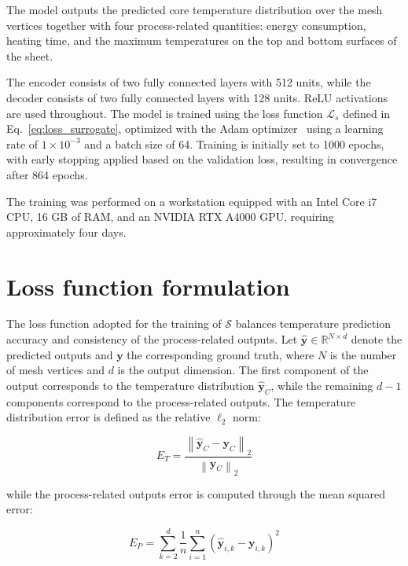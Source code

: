 The model outputs the predicted core temperature distribution over the mesh vertices together with four process-related quantities: energy consumption, heating time, and the maximum temperatures on the top and bottom surfaces of the sheet.

The encoder consists of two fully connected layers with 512 units, while the decoder consists of two fully connected layers with 128 units. ReLU activations are used throughout. The model is trained using the loss function $\mathcal{L}_s$ defined in Eq.~\ref{eq:loss_surrogate}, optimized with the Adam optimizer~\cite{kingma2014adam} using a learning rate of $1 \times 10^{-3}$ and a batch size of 64. Training is initially set to 1000 epochs, with early stopping applied based on the validation loss, resulting in convergence after 864 epochs.

The training was performed on a workstation equipped with an Intel Core i7 CPU, 16 GB of RAM, and an NVIDIA RTX A4000 GPU, requiring approximately four days.

\section{Loss function formulation}

The loss function adopted for the training of $\mathcal{S}$ balances temperature prediction accuracy and consistency of the process-related outputs. Let $\hat{\mathbf{y}} \in \mathbb{R}^{N \times d}$ denote the predicted outputs and $\mathbf{y}$ the corresponding ground truth, where $N$ is the number of mesh vertices and $d$ is the output dimension. The first component of the output corresponds to the temperature distribution $\hat{\mathbf{y}}_C$, while the remaining $d-1$ components correspond to the process-related outputs. The temperature distribution error is defined as the relative $\ell_2$ norm:

\begin{equation}
	E_T = \frac{\left\| \hat{\mathbf{y}}_C - \mathbf{y}_C \right\|_2}{\left\| \mathbf{y}_C \right\|_2}
\end{equation}

\noindent while the process-related outputs error is computed through the mean squared error:

\begin{equation}
	E_P = \sum_{k=2}^{d} \frac{1}{n} \sum_{i=1}^{n} \left( \hat{\mathbf{y}}_{i,k} - \mathbf{y}_{i,k} \right)^2
\end{equation}


